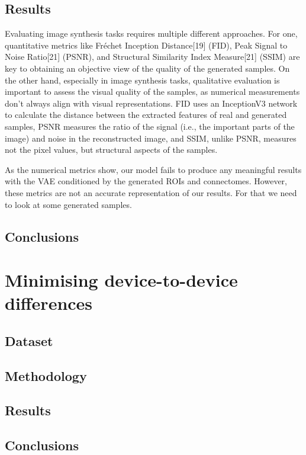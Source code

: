 	\subsection{Results}
	
	Evaluating image synthesis tasks requires multiple different approaches. For one, quantitative metrics like Fréchet Inception Distance[19] (FID), Peak Signal to Noise Ratio[21]
	(PSNR), and Structural Similarity Index Measure[21] (SSIM) are key to obtaining an objective view of the quality of the generated samples. On the other hand, especially in
	image synthesis tasks, qualitative evaluation is important to assess the visual quality of
	the samples, as numerical measurements don’t always align with visual representations.
	FID uses an InceptionV3 network to calculate the distance between the extracted features
	of real and generated samples, PSNR measures the ratio of the signal (i.e., the important parts of the image) and noise in the reconstructed image, and SSIM, unlike PSNR,
	measures not the pixel values, but structural aspects of the samples.
	
	As the numerical metrics show, our model fails to produce any meaningful results with
	the VAE conditioned by the generated ROIs and connectomes. However, these metrics are
	not an accurate representation of our results. For that we need to look at some generated
	samples.
	
	\subsection{Conclusions}

\section{Minimising device-to-device differences}

	\subsection{Dataset}
	
	\subsection{Methodology}
	
	\subsection{Results}
	
	\subsection{Conclusions}